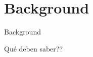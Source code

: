\section{Background}
	
\begin{frame}{Background}
	\begin{block}{}
	Qué deben saber??
	\end{block}
\end{frame}